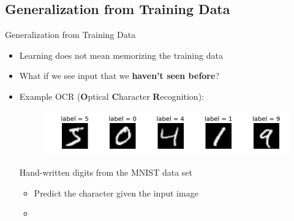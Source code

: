 \subsection{Generalization from Training Data}

\begin{frame}{Generalization from Training Data}{}\important
	\begin{itemize}
		\item Learning does not mean memorizing the training data
		\item What if we see input that we \textbf{haven't seen before}?
		\item Example OCR (\textbf{O}ptical \textbf{C}haracter \textbf{R}ecognition):
		\begin{figure}
			\centering
			\includegraphics[scale=0.4]{01_intro_ml/02_img/mnist_digits}
		\end{figure}
		\vspace*{-4mm}
		\hfill{\scriptsize Hand-written digits from the MNIST data set}
		\begin{itemize}
			\item Predict the character given the input image
			\item {}
		\end{itemize}
	\end{itemize}
\end{frame}


